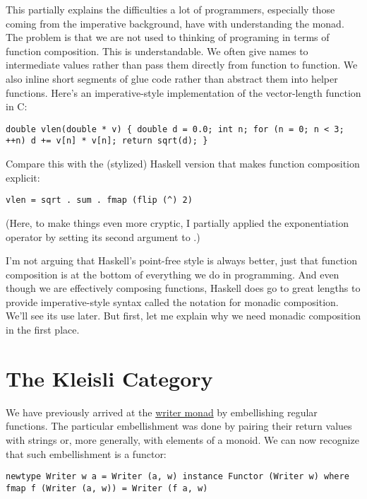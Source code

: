 This partially explains the difficulties a lot of programmers,
especially those coming from the imperative background, have with
understanding the monad. The problem is that we are not used to thinking
of programing in terms of function composition. This is understandable.
We often give names to intermediate values rather than pass them
directly from function to function. We also inline short segments of
glue code rather than abstract them into helper functions. Here's an
imperative-style implementation of the vector-length function in C:

\begin{verbatim}
double vlen(double * v) { double d = 0.0; int n; for (n = 0; n < 3; ++n) d += v[n] * v[n]; return sqrt(d); }
\end{verbatim}

Compare this with the (stylized) Haskell version that makes function
composition explicit:

\begin{verbatim}
vlen = sqrt . sum . fmap (flip (^) 2)
\end{verbatim}

(Here, to make things even more cryptic, I partially applied the
exponentiation operator \code{(\^{})} by setting its second argument
to .)

I'm not arguing that Haskell's point-free style is always better, just
that function composition is at the bottom of everything we do in
programming. And even though we are effectively composing functions,
Haskell does go to great lengths to provide imperative-style syntax
called the  notation for monadic composition. We'll see its
use later. But first, let me explain why we need monadic composition in
the first place.

\section{The Kleisli Category}\label{the-kleisli-category}

We have previously arrived at the
\href{https://bartoszmilewski.com/2014/12/23/kleisli-categories/}{writer
monad} by embellishing regular functions. The particular embellishment
was done by pairing their return values with strings or, more generally,
with elements of a monoid. We can now recognize that such embellishment
is a functor:

\begin{verbatim}
newtype Writer w a = Writer (a, w) instance Functor (Writer w) where fmap f (Writer (a, w)) = Writer (f a, w)
\end{verbatim}

